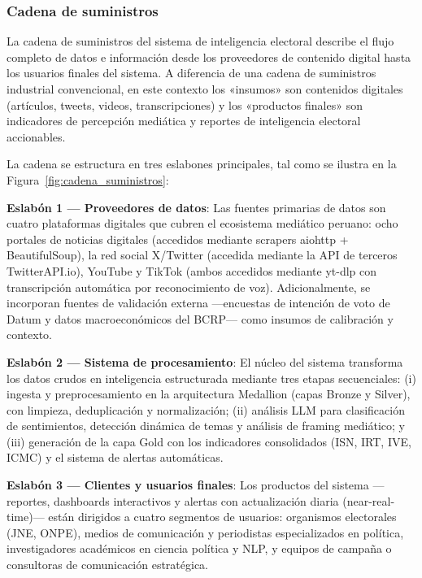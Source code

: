 \subsubsection{Cadena de suministros}

La cadena de suministros del sistema de inteligencia electoral describe el flujo completo de datos e información desde los proveedores de contenido digital hasta los usuarios finales del sistema. A diferencia de una cadena de suministros industrial convencional, en este contexto los «insumos» son contenidos digitales (artículos, tweets, videos, transcripciones) y los «productos finales» son indicadores de percepción mediática y reportes de inteligencia electoral accionables.

La cadena se estructura en tres eslabones principales, tal como se ilustra en la Figura~\ref{fig:cadena_suministros}:

\textbf{Eslabón 1 — Proveedores de datos}: Las fuentes primarias de datos son cuatro plataformas digitales que cubren el ecosistema mediático peruano: ocho portales de noticias digitales (accedidos mediante scrapers aiohttp + BeautifulSoup), la red social X/Twitter (accedida mediante la API de terceros TwitterAPI.io), YouTube y TikTok (ambos accedidos mediante yt-dlp con transcripción automática por reconocimiento de voz). Adicionalmente, se incorporan fuentes de validación externa —encuestas de intención de voto de Datum y datos macroeconómicos del BCRP— como insumos de calibración y contexto.

\textbf{Eslabón 2 — Sistema de procesamiento}: El núcleo del sistema transforma los datos crudos en inteligencia estructurada mediante tres etapas secuenciales: (i) ingesta y preprocesamiento en la arquitectura Medallion (capas Bronze y Silver), con limpieza, deduplicación y normalización; (ii) análisis LLM para clasificación de sentimientos, detección dinámica de temas y análisis de framing mediático; y (iii) generación de la capa Gold con los indicadores consolidados (ISN, IRT, IVE, ICMC) y el sistema de alertas automáticas.

\textbf{Eslabón 3 — Clientes y usuarios finales}: Los productos del sistema —reportes, dashboards interactivos y alertas con actualización diaria (near-real-time)— están dirigidos a cuatro segmentos de usuarios: organismos electorales (JNE, ONPE), medios de comunicación y periodistas especializados en política, investigadores académicos en ciencia política y NLP, y equipos de campaña o consultoras de comunicación estratégica.

